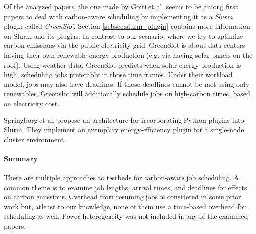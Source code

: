 Of the analyzed papers, the one made by Goiri et al. \cite{inigo_goiri_greenslot_2011} seems to be among first papers to deal with carbon-aware scheduling by implementing it as a \emph{Slurm} plugin called \emph{GreenSlot}. 
Section \ref{subsec:slurm_plugin} contains more information on Slurm and its plugins.
In contrast to our scenario, where we try to optimize carbon emissions via the public electricity grid, GreenSlot is about data centers having their own renewable energy production (e.g. via having solar panels on the roof). 
Using weather data, GreenSlot predicts when solar energy production is high, scheduling jobs preferably in those time frames.
Under their workload model, jobs may also have deadlines.
If those deadlines cannot be met using only renewables, Greenslot will additionally schedule jobs on high-carbon times, based on electricity cost.

Springborg et al. \cite{aaen_springborg_automatic_2023} propose an architecture for incorporating Python plugins into Slurm. 
They implement an exemplary energy-efficiency plugin for a single-node cluster environment. 

\paragraph{Summary}
There are multiple approaches to testbeds for carbon-aware job scheduling. 
A common theme is to examine job lengths, arrival times, and deadlines for effects on carbon emissions. 
Overhead from resuming jobs is considered in some prior work but, atleast to our knowledge, none of them use a time-based overhead for scheduling as well. 
Power heterogeneity was not included in any of the examined papers.